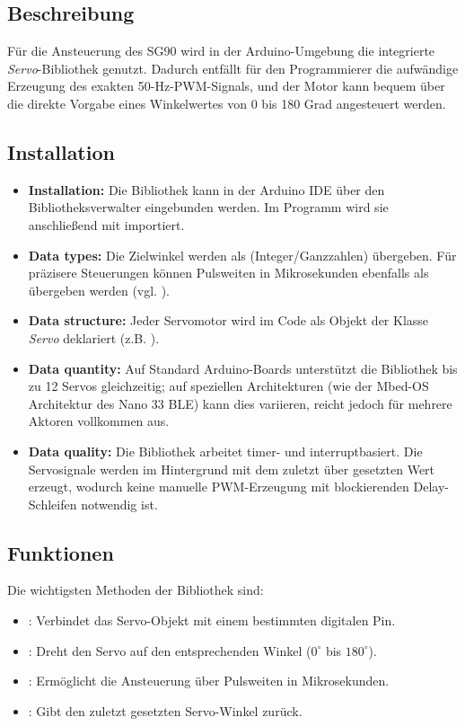 \subsection{Beschreibung}
Für die Ansteuerung des SG90 wird in der Arduino-Umgebung die integrierte
\textit{Servo}-Bibliothek genutzt\cite{ArduinoServo:2025}. Dadurch entfällt für den Programmierer die aufwändige Erzeugung des exakten 50-Hz-PWM-Signals, und der Motor kann bequem über die direkte Vorgabe eines Winkelwertes von 0 bis 180 Grad angesteuert werden.\cite{ArduinoServo:2025}

\subsection{Installation}
\begin{itemize}
	\item \textbf{Installation:} Die Bibliothek kann in der Arduino IDE über den Bibliotheksverwalter eingebunden werden. Im Programm wird sie anschließend mit  importiert.\cite{SparkFun:2026}

	\item \textbf{Data types:} Die Zielwinkel werden als  (Integer/Ganzzahlen) übergeben. Für präzisere Steuerungen können Pulsweiten in Mikrosekunden ebenfalls als  übergeben werden (vgl. \cite{ArduinoServo.h:2025}).
	\item \textbf{Data structure:} Jeder Servomotor wird im Code als Objekt der Klasse \textit{Servo} deklariert (z.B. ).
	\item \textbf{Data quantity:} Auf Standard Arduino-Boards unterstützt die Bibliothek bis zu 12 Servos gleichzeitig; auf speziellen Architekturen (wie der Mbed-OS Architektur des Nano 33 BLE) kann dies variieren, reicht jedoch für mehrere Aktoren vollkommen aus.\cite{ArduinoServoRef}
	\item \textbf{Data quality:} Die Bibliothek arbeitet timer- und interruptbasiert. Die Servosignale werden im Hintergrund mit dem zuletzt über  gesetzten Wert erzeugt, wodurch keine manuelle PWM-Erzeugung mit blockierenden Delay-Schleifen notwendig ist.\cite{ArduinoServo.h:2025}
\end{itemize}

\subsection{Funktionen}
Die wichtigsten Methoden der Bibliothek sind:
\begin{itemize}
	\item {}: Verbindet das Servo-Objekt mit einem bestimmten digitalen Pin.\cite{ArduinoAttach}
	\item {}: Dreht den Servo auf den entsprechenden Winkel ($0^\circ$ bis $180^\circ$).
	\item {}: Ermöglicht die Ansteuerung über Pulsweiten in Mikrosekunden.\cite{ArduinoWr}
	\item {}: Gibt den zuletzt gesetzten Servo-Winkel zurück.\cite{Arduino}
\end{itemize}

